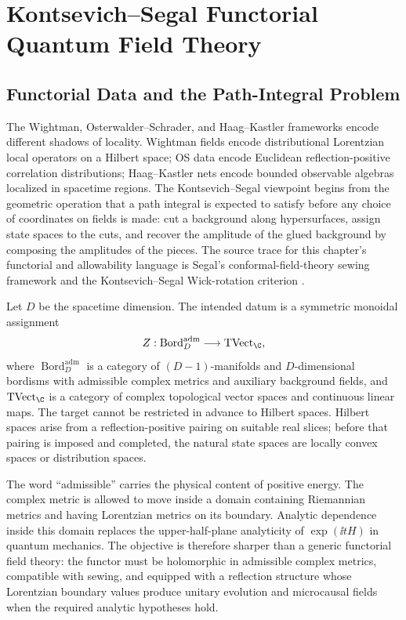 \chapter{Kontsevich--Segal Functorial Quantum Field Theory}
\label{ch:kontsevich-segal-functorial-qft}
\ConventionsEuclidean

\section{Functorial Data and the Path-Integral Problem}

The Wightman, Osterwalder--Schrader, and Haag--Kastler frameworks encode
different shadows of locality.  Wightman fields encode distributional
Lorentzian local operators on a Hilbert space; OS data encode Euclidean
reflection-positive correlation distributions; Haag--Kastler nets encode
bounded observable algebras localized in spacetime regions.  The
Kontsevich--Segal viewpoint begins from the geometric operation that a path
integral is expected to satisfy before any choice of coordinates on fields is
made: cut a background along hypersurfaces, assign state spaces to the cuts,
and recover the amplitude of the glued background by composing the amplitudes
of the pieces.  The source trace for this chapter's functorial and
allowability language is Segal's conformal-field-theory sewing framework and
the Kontsevich--Segal Wick-rotation criterion
\cite{Segal2004,KontsevichSegal2021}.

Let \(D\) be the spacetime dimension.  The intended datum is a symmetric
monoidal assignment
\[
  Z:\operatorname{Bord}_{D}^{\mathrm{adm}}\longrightarrow
  \operatorname{TVect}_{\C},
\]
where \(\operatorname{Bord}_{D}^{\mathrm{adm}}\) is a category of
\((D-1)\)-manifolds and \(D\)-dimensional bordisms with admissible complex
metrics and auxiliary background fields, and
\(\operatorname{TVect}_{\C}\) is a category of complex topological vector
spaces and continuous linear maps.  The target cannot be restricted in
advance to Hilbert spaces.  Hilbert spaces arise from a reflection-positive
pairing on suitable real slices; before that pairing is imposed and
completed, the natural state spaces are locally convex spaces or distribution
spaces.

The word ``admissible'' carries the physical content of positive energy.  The
complex metric is allowed to move inside a domain containing Riemannian
metrics and having Lorentzian metrics on its boundary.  Analytic dependence
inside this domain replaces the upper-half-plane analyticity of
\(\exp(\ii tH)\) in quantum mechanics.  The objective is therefore sharper
than a generic functorial field theory: the functor must be holomorphic in
admissible complex metrics, compatible with sewing, and equipped with a
reflection structure whose Lorentzian boundary values produce unitary
evolution and microcausal fields when the required analytic hypotheses hold.

